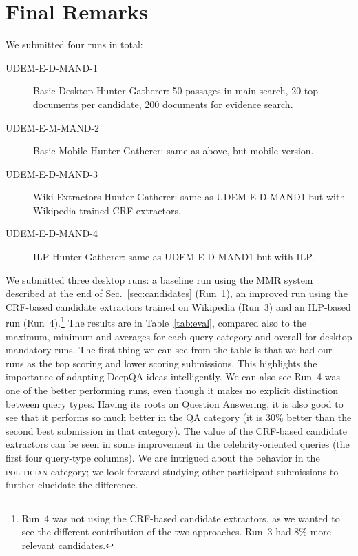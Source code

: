 \section{Final Remarks}

We submitted four runs in total:

\begin{description}

\item[UDEM-E-D-MAND-1] Basic Desktop Hunter Gatherer: 50 passages in main search, 20 top documents per candidate, 200 documents for evidence search.

\item[UDEM-E-M-MAND-2] Basic Mobile Hunter Gatherer: same as above, but mobile version.

\item[UDEM-E-D-MAND-3] Wiki Extractors Hunter Gatherer: same as UDEM-E-D-MAND1 but with Wikipedia-trained CRF extractors.

\item[UDEM-E-D-MAND-4] ILP Hunter Gatherer: same as UDEM-E-D-MAND1 but with ILP.

\end{description}


We submitted three desktop runs: a baseline run using the MMR system
described at the end of Sec.~\ref{sec:candidates} (Run~1),
an improved run using the CRF-based candidate extractors trained on
Wikipedia (Run~3) and an ILP-based run (Run~4).\footnote{Run~4 was not
  using the CRF-based candidate extractors, as we wanted to see the
  different contribution of the two approaches. Run~3 had 8\% more
  relevant candidates.} The results are in Table~\ref{tab:eval},
compared also to the maximum, minimum and averages for each query
category and overall for desktop mandatory runs. The first thing we can see from the table is
that we had our runs as the top scoring and lower scoring
submissions. This highlights the importance of adapting DeepQA ideas
intelligently. We can also see Run~4 was one of the better performing
runs, even though it makes no explicit distinction between query
types. Having its roots on Question Answering, it is also good to see
that it performs so much better in the \textsc{QA} category (it is
30\% better than the second best submission in that category). The
value of the CRF-based candidate extractors can be seen in some
improvement in the celebrity-oriented queries (the first four
query-type columns). We are intrigued about the behavior in the
\textsc{politician} category; we look forward studying other
participant submissions to further elucidate the difference.


